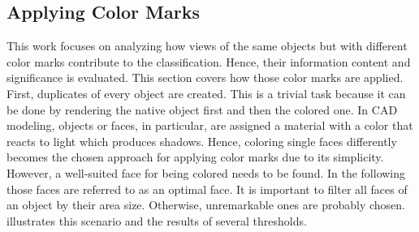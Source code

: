 \subsection{Applying Color Marks}
\label{sec:dataset-material-feature}
This work focuses on analyzing how views of the same objects but with different color marks contribute to the classification.
Hence, their information content and significance is evaluated.
This section covers how those color marks are applied.
First, duplicates of every object are created.
This is a trivial task because it can be done by rendering the native object first and then the colored one.
In CAD modeling, objects or faces, in particular, are assigned a material with a color that reacts to light which produces shadows.
Hence, coloring single faces differently becomes the chosen approach for applying color marks due to its simplicity.
However, a well-suited face for being colored needs to be found.
In the following those faces are referred to as an optimal face.
It is important to filter all faces of an object by their area size.
Otherwise, unremarkable ones are probably chosen.
 illustrates this scenario and the results of several thresholds.
